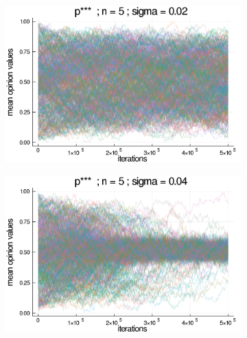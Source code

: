 \documentclass{article}
\begin{document}
    
    \begin{figure}[H]
      \centering
      \begin{subfigure}[b]{0.48\textwidth}
        \includegraphics[width=\textwidth]{img/series/tseries2/Poodlcalculatep***n5-rho005-sigma002-00intransrandom.png}
      \end{subfigure}
      
      \begin{subfigure}[b]{0.48\textwidth}
        \includegraphics[width=\textwidth]{img/series/tseries2/Poodlcalculatep***n5-rho005-sigma004-00intransrandom.png}
      \end{subfigure}
      

\end{figure}
\end{document}
